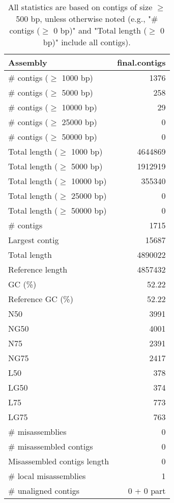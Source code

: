 \documentclass[12pt,a4paper]{article}
\begin{document}
\begin{table}[ht]
\begin{center}
\caption{All statistics are based on contigs of size $\geq$ 500 bp, unless otherwise noted (e.g., "\# contigs ($\geq$ 0 bp)" and "Total length ($\geq$ 0 bp)" include all contigs).}
\begin{tabular}{|l*{1}{|r}|}
\hline
Assembly & final.contigs \\ \hline
\# contigs ($\geq$ 1000 bp) & 1376 \\ \hline
\# contigs ($\geq$ 5000 bp) & 258 \\ \hline
\# contigs ($\geq$ 10000 bp) & 29 \\ \hline
\# contigs ($\geq$ 25000 bp) & 0 \\ \hline
\# contigs ($\geq$ 50000 bp) & 0 \\ \hline
Total length ($\geq$ 1000 bp) & 4644869 \\ \hline
Total length ($\geq$ 5000 bp) & 1912919 \\ \hline
Total length ($\geq$ 10000 bp) & 355340 \\ \hline
Total length ($\geq$ 25000 bp) & 0 \\ \hline
Total length ($\geq$ 50000 bp) & 0 \\ \hline
\# contigs & 1715 \\ \hline
Largest contig & 15687 \\ \hline
Total length & 4890022 \\ \hline
Reference length & 4857432 \\ \hline
GC (\%) & 52.22 \\ \hline
Reference GC (\%) & 52.22 \\ \hline
N50 & 3991 \\ \hline
NG50 & 4001 \\ \hline
N75 & 2391 \\ \hline
NG75 & 2417 \\ \hline
L50 & 378 \\ \hline
LG50 & 374 \\ \hline
L75 & 773 \\ \hline
LG75 & 763 \\ \hline
\# misassemblies & 0 \\ \hline
\# misassembled contigs & 0 \\ \hline
Misassembled contigs length & 0 \\ \hline
\# local misassemblies & 1 \\ \hline
\# unaligned contigs & 0 + 0 part \\ \hline

\end{tabular}
\end{center}
\end{table}
\end{document}
